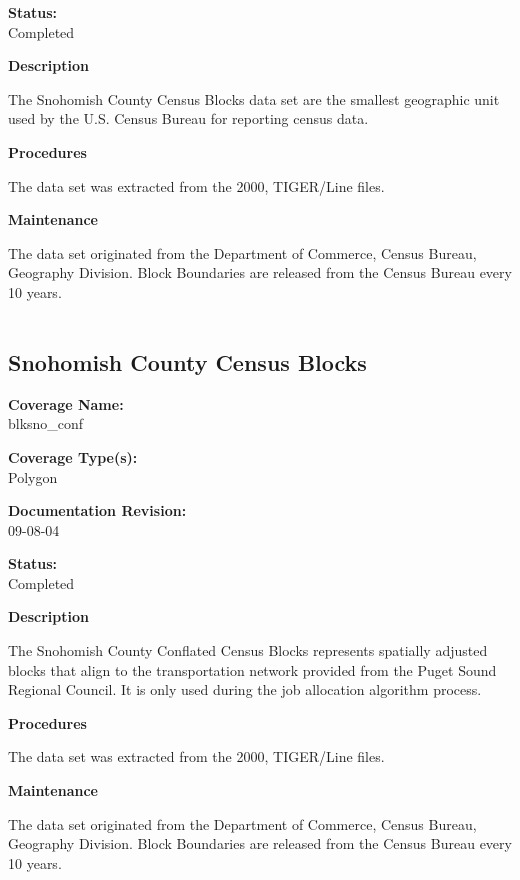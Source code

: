 {\bf \large Status:}\\
Completed

{\bf \large Description}

The Snohomish County Census Blocks data set are the smallest
geographic unit used by the U.S. Census Bureau for reporting
census data.

{\bf \large Procedures}

The data set was extracted from the 2000, TIGER/Line files.

{\bf \large Maintenance}

The data set originated from the Department of Commerce, Census
Bureau, Geography Division. Block Boundaries are released from the
Census Bureau every 10 years.

\begin{landscape}
\begin{longtable}{llrrrrrc}

\end{longtable}
\end{landscape}
\newpage

\subsection{Snohomish County Census Blocks}

{\bf \large Coverage Name:}\\
blksno\_conf

{\bf \large Coverage Type(s):}\\
Polygon

{\bf \large Documentation Revision:}\\
09-08-04

{\bf \large Status:}\\
Completed

{\bf \large Description}

The Snohomish County Conflated Census Blocks represents spatially
adjusted blocks that align to the transportation network provided
from the Puget Sound Regional Council. It is only used during the
job allocation algorithm process.

{\bf \large Procedures}

The data set was extracted from the 2000, TIGER/Line files.

{\bf \large Maintenance}

The data set originated from the Department of Commerce, Census
Bureau, Geography Division. Block Boundaries are released from the
Census Bureau every 10 years.

